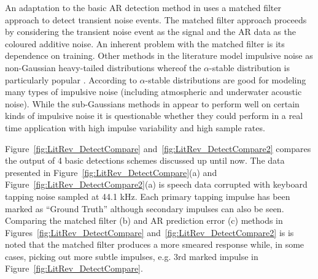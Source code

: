An adaptation to the basic AR detection method in \cite{Vaseghi1988} uses a matched filter approach to detect transient noise events. The matched filter approach proceeds by considering the transient noise event as the signal and the AR data as the coloured additive noise. 
An inherent problem with the matched filter is its dependence on training. Other methods in the literature model impulsive noise as non-Gaussian heavy-tailed distributions whereof the $\alpha$-stable distribution is particularly popular \cite{Tsihrintzis1997}\cite{Coates2002}. According to \cite{Nikias1995} $\alpha$-stable distributions are good for modeling many types of impulsive noise (including atmospheric and underwater acoustic noise). While the sub-Gaussians methods in \cite{Tsihrintzis1997}\cite{Coates2002} appear to perform well on certain kinds of impulsive noise it is questionable whether they could perform in a real time application with high impulse variability and high sample rates.

Figure~\ref{fig:LitRev_DetectCompare} and~\ref{fig:LitRev_DetectCompare2} compares the output of 4 basic detections schemes discussed up until now. The data presented in Figure~\ref{fig:LitRev_DetectCompare}(a) and Figure~\ref{fig:LitRev_DetectCompare2}(a) is speech data corrupted with keyboard tapping noise sampled at 44.1 kHz. Each primary tapping impulse has been marked as ``Ground Truth'' although secondary impulses can also be seen. Comparing the matched filter (b) and AR prediction error (c) methods in Figures~\ref{fig:LitRev_DetectCompare} and~\ref{fig:LitRev_DetectCompare2} is is noted that the matched filter produces a more smeared response while, in some cases, picking out more subtle impulses\cite{Godsill1998book}, e.g. 3rd marked impulse in Figure~\ref{fig:LitRev_DetectCompare}.


